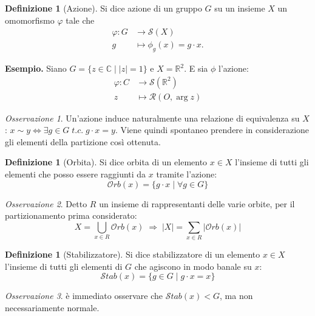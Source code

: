 \documentclass[a4paper]{article}
\theoremstyle{remark}
\newtheorem*{remark}{Osservazione}
\theoremstyle{definition}
\newtheorem{definition}[theorem]{Definizione}
\newcommand{\Orb}[1]{\mathcal{O}rb\left( #1 \right)}
\newcommand{\Stab}[1]{\mathcal{S}tab\left( #1 \right)}
\begin{document}
\begin{multicols}{2}
\begin{definition}[Azione]
	Si dice azione di un gruppo $ G $ su un insieme $ X $ un omomorfismo $ \varphi $ tale che \begin{align*}
	\varphi \colon G &\to \mathcal{S}\left(X\right) \\
	g &\mapsto \phi_g(x) = g \cdot x.
	\end{align*}
\end{definition}

\textbf{Esempio.} Siano $ G = \{ z \in \mathbb{C} \mid |z| = 1 \} $ e $ X = \mathbb{R}^2 $. E sia $ \phi $ l'azione: \begin{align*}
\varphi \colon C &\to \mathcal{S}\left(\mathbb{R}^2\right) \\
z &\mapsto \mathcal{R}(O, \arg z)
\end{align*}

\begin{remark}
	Un'azione induce naturalmente una relazione di equivalenza su $ X $: $ x \sim y \Leftrightarrow \exists g \in G \; t.c.\; g \cdot x = y $. Viene quindi spontaneo prendere in considerazione gli elementi della partizione così ottenuta. 
\end{remark}
\begin{definition}[Orbita]
	Si dice orbita di un elemento $ x \in X $ l'insieme di tutti gli elementi che posso essere raggiunti da $ x $ tramite l'azione: \[ \Orb{x} = \{ g \cdot x \mid \forall g \in G \} \]
\end{definition}
\begin{remark}
	Detto $ R $ un insieme di rappresentanti delle varie orbite, per il partizionamento prima considerato: \[ X = \bigcup_{x \in R} \Orb{x} \;\Rightarrow\; |X| = \sum_{x \in R} |\Orb{x}| \]
\end{remark}

\begin{definition}[Stabilizzatore]
	Si dice stabilizzatore di un elemento $ x \in X $ l'insieme di tutti gli elementi di $ G $ che agiscono in modo banale su $ x $: \[ \Stab{x} = \{ g \in G \mid g \cdot x = x \} \]
\end{definition}
\begin{remark}
	è immediato osservare che $ \Stab{x} < G $, ma non necessariamente normale.
\end{remark}


\end{multicols}
\end{document}
